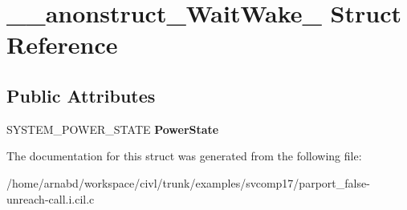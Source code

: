 \hypertarget{struct____anonstruct__WaitWake__79}{}\section{\+\_\+\+\_\+anonstruct\+\_\+\+Wait\+Wake\+\_ Struct Reference}
\label{struct____anonstruct__WaitWake__79}
\subsection*{Public Attributes}
\begin{DoxyCompactItemize}
\item 
\hypertarget{struct____anonstruct__WaitWake__79_a5879322d513cb7559248205082330cab}{}S\+Y\+S\+T\+E\+M\+\_\+\+P\+O\+W\+E\+R\+\_\+\+S\+T\+A\+T\+E {\bfseries Power\+State}\label{struct____anonstruct__WaitWake__79_a5879322d513cb7559248205082330cab}

\end{DoxyCompactItemize}


The documentation for this struct was generated from the following file\+:\begin{DoxyCompactItemize}
\item 
/home/arnabd/workspace/civl/trunk/examples/svcomp17/parport\+\_\+false-\/unreach-\/call.\+i.\+cil.\+c\end{DoxyCompactItemize}
